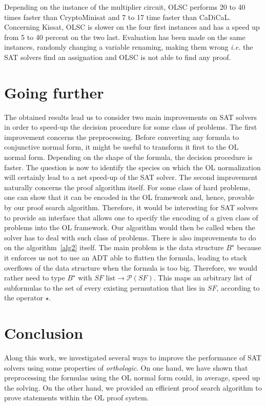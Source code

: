 \documentclass[a4paper, 11pt]{article}
\newcommand{\ie}{ \textit{i.e.} }
\begin{document}
    Depending on the instance of the multiplier circuit, OLSC performs 20 to 40 times faster than 
    CryptoMinisat and 7 to 17 time faster than CaDiCaL. Concerning Kissat, OLSC is slower on the four 
    first instances and has a speed up from 5 to 40 percent on the two last.
    Evaluation has been made on the same instances, randomly changing a variable renaming, making them 
    wrong \ie the SAT solvers find an assignation and OLSC is not able to find any proof.

    \section{Going further}
    The obtained results lead us to consider two main improvements on SAT solvers in order to speed-up 
    the decision procedure for some class of problems. 
    The first improvement concerns the preprocessing. Before converting any formula to
    conjunctive normal form, it might be useful to transform it first to the OL normal form. Depending
    on the shape of the formula, the decision procedure is faster. The question is now to identify the
    species on which the OL normalization will certainly lead to a net speed-up of the SAT solver. 
    The second improvement naturally 
    concerns the proof algorithm itself. For some class of hard problems, one can show that it can be
    encoded in the OL framework and, hence, provable by our proof search algorithm. Therefore, it
    would be interesting for SAT solvers to provide an interface that allows one to specify the
    encoding of a given class of problems into the OL framework. Our algorithm would then be called
    when the solver has to deal with such class of problems. There is also improvements to do on the
    algorithm~\ref{alg2} itself. The main problem is the data structure $B^\star$ because it enforces
    us not to use an ADT able to flatten the formula, leading to stack overflows of the data structure
    when the formula is too big. Therefore, we would rather need to type $B^\star$ with 
    $SF\text{ list}\rightarrow\mathcal{P}(SF)$. This maps an arbitrary list of subformulas to
    the set of every existing permutation that lies in $SF$, according to the operator $\star$.
    \section{Conclusion} 
    Along this work, we investigated several ways to improve the performance of SAT solvers using
    some properties of \textit{orthologic}. On one hand, we have shown that preprocessing the formulas 
    using the OL normal form could, in average, speed up the solving. On the other hand, we provided an
    efficient proof search algorithm to prove statements within the OL proof system.
    
    
\end{document}
